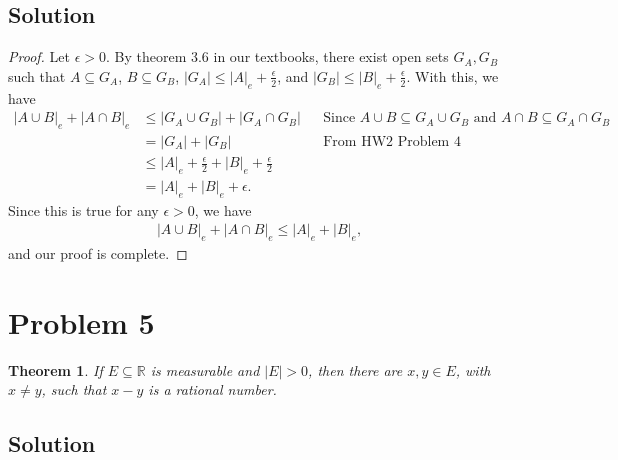 \documentclass[10pt,a4paper]{article}
\theoremstyle{theorem}
\newtheorem{theorem}{Theorem}
\theoremstyle{definition}
\begin{document}
\subsection*{Solution}
\begin{proof}
Let $\epsilon > 0$. By theorem 3.6 in our textbooks, there exist open sets $G_A , G_B$ such that $A \subseteq G_A$, $B \subseteq G_B$, $|G_A| \leq |A|_e + \frac{\epsilon}{2}$, and $|G_B| \leq |B|_e + \frac{\epsilon}{2}$. With this, we have
\begin{align*}
|A \cup B|_e + |A \cap B|_e &\leq |G_A \cup G_B| + |G_A \cap G_B| &&\text{Since } A \cup B \subseteq G_A \cup G_B \text{ and } A \cap B \subseteq G_A \cap G_B\\
&= |G_A| + |G_B| &&\text{From HW2 Problem 4}\\
&\leq |A|_e + \frac{\epsilon}{2} + |B|_e + \frac{\epsilon}{2}\\
&= |A|_e +|B|_e + \epsilon.
\end{align*}
Since this is true for any $\epsilon > 0$, we have
\begin{align*}
|A \cup B|_e + |A \cap B|_e \leq |A|_e + |B|_e,
\end{align*}
and our proof is complete.
\end{proof}

\section*{Problem 5}
\begin{theorem}
If $E \subseteq \mathbb{R}$ is measurable and $|E| > 0$, then there are $x, y \in E$, with $x \not = y$,  such that $x - y$ is a rational number.
\end{theorem}

\subsection*{Solution}
\end{document}

